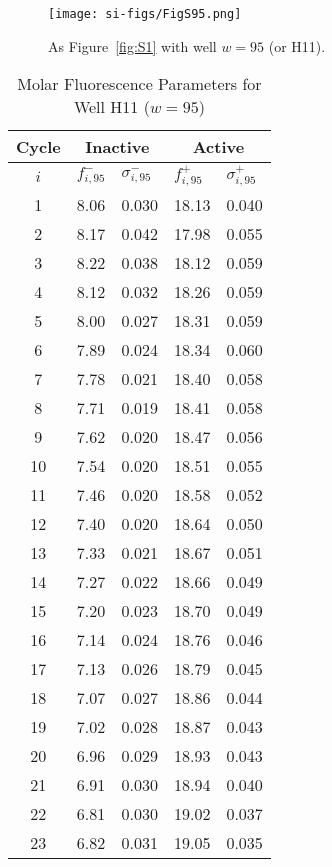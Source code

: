                 \begin{figure}
                    \centering
                    \texttt{[image: si-figs/FigS95.png]}
                    \caption{
                        As Figure~\ref{fig:S1} with well $w=95$ (or H11).
                    }
                \end{figure}
                \clearpage
    \begin{table}
        \caption{Molar Fluorescence Parameters for Well H11 ($w=95$)}
        \centering
        \begin{tabular}{c|ll|ll}
            Cycle & \multicolumn{2}{c|}{Inactive} & \multicolumn{2}{c}{Active} \\
            \hline
            $i$ & $f_{i,95}^{-}$ & $\sigma_{i,95}^{-}$ &  $f_{i,95}^{+}$ & $\sigma_{i,95}^{+}$ \\
            \hline
    1 & 8.06 & 0.030 & 18.13 & 0.040 \\
2 & 8.17 & 0.042 & 17.98 & 0.055 \\
3 & 8.22 & 0.038 & 18.12 & 0.059 \\
4 & 8.12 & 0.032 & 18.26 & 0.059 \\
5 & 8.00 & 0.027 & 18.31 & 0.059 \\
6 & 7.89 & 0.024 & 18.34 & 0.060 \\
7 & 7.78 & 0.021 & 18.40 & 0.058 \\
8 & 7.71 & 0.019 & 18.41 & 0.058 \\
9 & 7.62 & 0.020 & 18.47 & 0.056 \\
10 & 7.54 & 0.020 & 18.51 & 0.055 \\
11 & 7.46 & 0.020 & 18.58 & 0.052 \\
12 & 7.40 & 0.020 & 18.64 & 0.050 \\
13 & 7.33 & 0.021 & 18.67 & 0.051 \\
14 & 7.27 & 0.022 & 18.66 & 0.049 \\
15 & 7.20 & 0.023 & 18.70 & 0.049 \\
16 & 7.14 & 0.024 & 18.76 & 0.046 \\
17 & 7.13 & 0.026 & 18.79 & 0.045 \\
18 & 7.07 & 0.027 & 18.86 & 0.044 \\
19 & 7.02 & 0.028 & 18.87 & 0.043 \\
20 & 6.96 & 0.029 & 18.93 & 0.043 \\
21 & 6.91 & 0.030 & 18.94 & 0.040 \\
22 & 6.81 & 0.030 & 19.02 & 0.037 \\
23 & 6.82 & 0.031 & 19.05 & 0.035 \\

\end{tabular}
\end{table}
